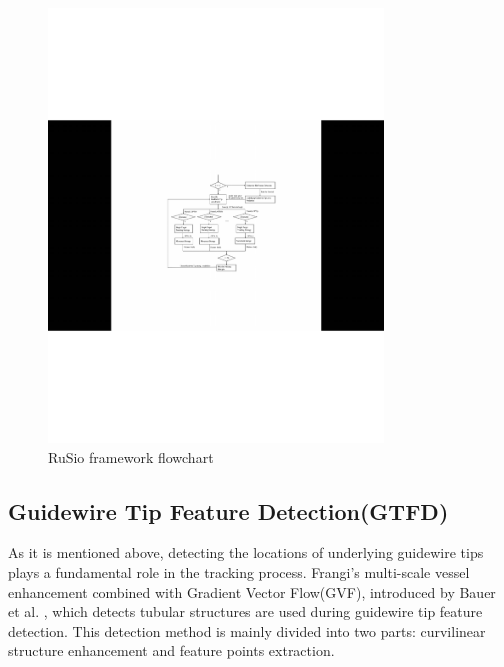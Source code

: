 \documentclass[journal]{IEEEtran}
\begin{document}
\begin{figure}[!htb]
	\centering  
	\includegraphics[width=3.5in]{figures/figure2}
		\caption{RuSio framework flowchart} 
	\label{fig:mcmthesis-logo} 
\end{figure}



\subsection{Guidewire Tip Feature Detection(GTFD)}
As it is mentioned above, detecting the locations of underlying guidewire tips plays a fundamental role in the tracking process. Frangi's multi-scale vessel enhancement\cite{frangi1998multiscale} combined with Gradient Vector Flow(GVF), introduced by Bauer et al. \cite{bauer2008novel}, which detects tubular structures are used during guidewire tip feature detection. This detection method is mainly divided into two parts: curvilinear structure enhancement and feature points extraction.
\end{document}
